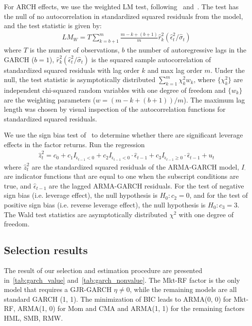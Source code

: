For ARCH effects, we use the weighted LM test, following~\textcite{FisherGallagher2012} and~\textcite{LiMak1994}. The test has the null of no autocorrelation in standardized squared residuals from the model, and the test statistic is given by:
\begin{align}
	LM_W = T \sum\limits_{k = b + 1}^{m} \frac{m - k + (b+1)}{m} \hat{r}^{2}_{k} (\hat{\epsilon}^{2}_{t} / \hat{\sigma}_{t})
\end{align}
where $T$ is the number of observations, $b$ the number of autoregressive lags in the GARCH ($b=1$), $\hat{r}^2_k (\hat{\epsilon}^2_t / \hat{\sigma}_t)$ is the squared sample autocorrelation of standardized squared residuals with lag order $k$ and max lag order $m$. Under the null, the test statistic is asymptotically distributed $\sum\limits^m_{k = 1} \chi^2_k w_k$, where $\{\chi^2_k\}$ are independent chi-squared random variables with one degree of freedom and $\{w_k\}$ are the weighting parameters ($w = (m - k + (b+1))/m$). The maximum lag length was chosen by visual inspection of the autocorrelation functions for standardized squared residuals.

We use the sign bias test of~\textcite{EngleNg1993} to determine whether there are significant leverage effects in the factor returns. Run the regression
\begin{align}
	\hat{z}_t^2 = c_0 + c_1 I_{\hat{\epsilon}_{t-1} < 0} + c_2 I_{\hat{\epsilon}_{t-1} < 0} \cdot \hat{\epsilon}_{t-1} + c_3 I_{\hat{\epsilon}_{t-1} \geq 0} \cdot \hat{\epsilon}_{t-1} + u_t
\end{align}
where $\hat{z}_t^2$ are the standardized squared residuals of the ARMA-GARCH model, $I_\cdot$ are indicator functions that are equal to one when the subscript conditions are true, and $\hat{\epsilon}_{t-1}$ are the lagged ARMA-GARCH residuals. For the test of negative sign bias (i.e. leverage effect), the null hypothesis is $H_0: c_2 = 0$, and for the test of positive sign bias (i.e. reverse leverage effect), the null hypothesis is $H_0: c_3 = 3$. The Wald test statistics are asymptotically distributed $\chi^2$ with one degree of freedom.


\subsection{Selection results}
\label{sub:selection_results}

The result of our selection and estimation procedure are presented in~\autoref{tab:garch_value} and~\autoref{tab:garch_nonvalue}. The Mkt-RF factor is the only model that requires a GJR-GARCH $\eta \neq 0$, while the remaining models are all standard GARCH (1, 1). The minimization of BIC leads to ARMA(0, 0) for Mkt-RF, ARMA(1, 0) for Mom and CMA and ARMA(1, 1) for the remaining factors HML, SMB, RMW. 

